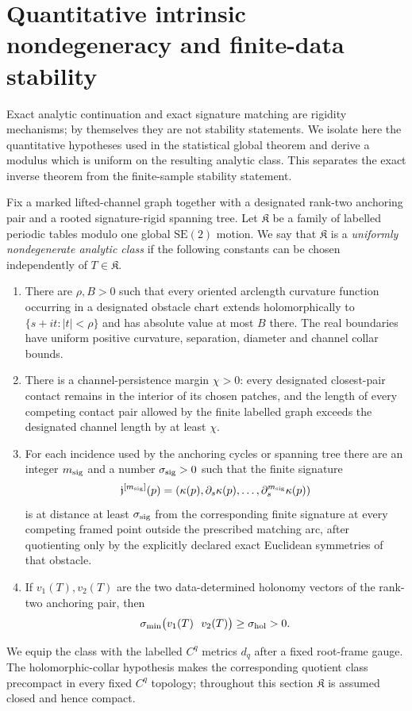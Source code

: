 \section{Quantitative intrinsic nondegeneracy and finite-data stability}
\label{sec:v24-quantitative-gluing}

Exact analytic continuation and exact signature matching are rigidity
mechanisms; by themselves they are not stability statements.  We isolate here
the quantitative hypotheses used in the statistical global theorem and derive
a modulus which is uniform on the resulting analytic class.  This separates
the exact inverse theorem from the finite-sample stability statement.

Fix a marked lifted-channel graph together with a designated rank-two
anchoring pair and a rooted signature-rigid spanning tree.  Let
\(\mathfrak K\) be a family of labelled periodic tables modulo one global
\(\mathrm{SE}(2)\) motion.  We say that \(\mathfrak K\) is a
\emph{uniformly nondegenerate analytic class} if the following constants can
be chosen independently of \(T\in\mathfrak K\).
\begin{enumerate}
\item There are \(\rho,B>0\) such that every oriented arclength curvature
function occurring in a designated obstacle chart extends holomorphically to
\(\{s+it:|t|<\rho\}\) and has absolute value at most \(B\) there.  The real
boundaries have uniform positive curvature, separation, diameter and channel
collar bounds.
\item There is a channel-persistence margin \(\chi>0\): every designated
closest-pair contact remains in the interior of its chosen patches, and the
length of every competing contact pair allowed by the finite labelled graph
exceeds the designated channel length by at least \(\chi\).
\item For each incidence used by the anchoring cycles or spanning tree there
are an integer \(m_{\rm sig}\) and a number \(\sigma_{\rm sig}>0\) such that
the finite signature
\[
 \mathfrak j^{[m_{\rm sig}]}(p)
   =(\kappa(p),\partial_s\kappa(p),\ldots,
                         \partial_s^{m_{\rm sig}}\kappa(p))
\]
is at distance at least \(\sigma_{\rm sig}\) from the corresponding finite
signature at every competing framed point outside the prescribed matching
arc, after quotienting only by the explicitly declared exact Euclidean
symmetries of that obstacle.
\item If \(v_1(T),v_2(T)\) are the two data-determined holonomy vectors of the
rank-two anchoring pair, then
\begin{equation}\label{eq:v24-holonomy-margin}
 \sigma_{\min}\bigl(v_1(T)\ \ v_2(T)\bigr)
                       \ge\sigma_{\rm hol}>0.
\end{equation}
\end{enumerate}
We equip the class with the labelled \(C^q\) metrics \(d_q\) after a fixed
root-frame gauge.  The holomorphic-collar hypothesis makes the corresponding
quotient class precompact in every fixed \(C^q\) topology; throughout this
section \(\mathfrak K\) is assumed closed and hence compact.


